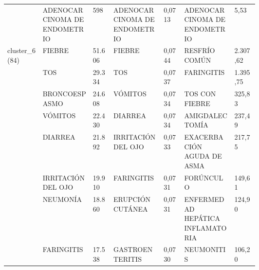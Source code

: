 \begin{landscape}
\begin{longtable}[c]{@{}lp{0.2\linewidth}lp{0.2\linewidth}lp{0.2\linewidth}l@{}}
                                  & ADENOCARCINOMA DE ENDOMETRIO                                  & 598    & ADENOCARCINOMA DE ENDOMETRIO                           & 0,0713 & ADENOCARCINOMA DE ENDOMETRIO                                  & 5,53     \\
\multirow{10}{*}{cluster\_6(84)}  & FIEBRE                                                        & 51.606 & FIEBRE                                                 & 0,0744 & RESFRÍO COMÚN                                                 & 2.307,62 \\
                                  & TOS                                                           & 29.334 & TOS                                                    & 0,0737 & FARINGITIS                                                    & 1.395,75 \\
                                  & BRONCOESPASMO                                                 & 24.608 & VÓMITOS                                                & 0,0734 & TOS CON FIEBRE                                                & 325,83   \\
                                  & VÓMITOS                                                       & 22.430 & DIARREA                                                & 0,0734 & AMIGDALECTOMÍA                                                & 237,49   \\
                                  & DIARREA                                                       & 21.892 & IRRITACIÓN DEL OJO                                     & 0,0733 & EXACERBACIÓN AGUDA DE ASMA                                    & 217,75   \\
                                  & IRRITACIÓN DEL OJO                                            & 19.910 & FARINGITIS                                             & 0,0731 & FORÚNCULO                                                     & 149,61   \\
                                  & NEUMONÍA                                                      & 18.860 & ERUPCIÓN CUTÁNEA                                       & 0,0731 & ENFERMEDAD HEPÁTICA INFLAMATORIA                              & 124,90   \\
                                  & FARINGITIS                                                    & 17.538 & GASTROENTERITIS                                        & 0,0730 & NEUMONITIS                                                    & 106,20   \\

\end{longtable}
\end{landscape}
